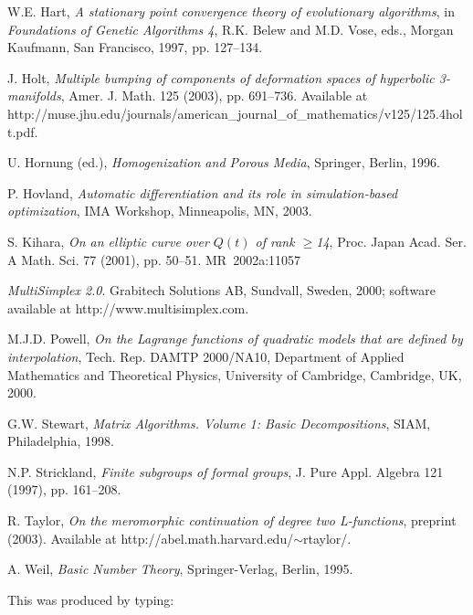 \documentclass[]{interact}
\theoremstyle{plain}%
\theoremstyle{definition}
\theoremstyle{remark}
\begin{document}
\begin{thebibliography}{99}
W.E. Hart, \emph{A stationary point convergence theory of evolutionary
  algorithms}, in \emph{Foundations of Genetic Algorithms 4}, R.K. Belew and
  M.D. Vose, eds., Morgan Kaufmann, San Francisco, 1997, pp. 127--134.

J. Holt, \emph{Multiple bumping of components of deformation spaces of
  hyperbolic 3-manifolds}, Amer. J. Math. 125 (2003), pp. 691--736. Available at
  http://muse.jhu.edu/journals/american\_journal\_of\_mathematics/v125/125.4holt.pdf.

U. Hornung (ed.), \emph{Homogenization and Porous Media}, Springer, Berlin,
  1996.

P. Hovland, \emph{Automatic differentiation and its role in simulation-based
  optimization}, IMA Workshop, Minneapolis, MN, 2003.

S. Kihara, \emph{On an elliptic curve over {$Q(t)$} of rank $\geq$14}, Proc.
  Japan Acad. Ser. A Math. Sci. 77 (2001), pp. 50--51. MR~2002a:11057

\emph{MultiSimplex 2.0}. Grabitech Solutions AB, Sundvall, Sweden, 2000;
  software available at http://www.multisimplex.com.

M.J.D. Powell, \emph{On the Lagrange functions of quadratic models that are
  defined by interpolation}, Tech. Rep. DAMTP 2000/NA10, Department of
  Applied Mathematics and Theoretical Physics, University of Cambridge,
  Cambridge, UK, 2000.

G.W. Stewart, \emph{Matrix Algorithms. Volume 1: Basic Decompositions}, SIAM,
  Philadelphia, 1998.

N.P. Strickland, \emph{Finite subgroups of formal groups}, J. Pure Appl.
  Algebra 121 (1997), pp. 161--208.

R. Taylor, \emph{On the meromorphic continuation of degree two L-functions},
  preprint (2003). Available at http://abel.math.harvard.edu/$\sim$rtaylor/.

A. Weil, \emph{Basic Number Theory}, Springer-Verlag, Berlin, 1995.

\end{thebibliography}
\bigskip
\noindent This was produced by typing:
\medskip
\end{document}
